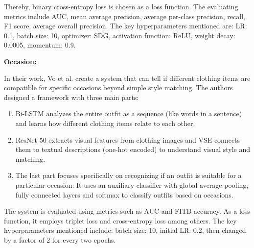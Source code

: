 Thereby, binary cross-entropy loss is chosen as a loss function. The evaluating metrics include \acs{AUC}, mean average precision, average per-class precision, recall, F1 score, average overall precision. The key hyperparameters mentioned are: \acs{LR}: 0.1, batch size: 10, optimizer: SDG, activation function: \acs{ReLU}, weight decay: 0.0005, momentum: 0.9. \cite[cf.]{pang_learning_2024}

\vspace{0.5cm}

\textbf{Occasion:}

\vspace{0.5cm}

In their work, Vo et al. create a system that can tell if different clothing items are compatible for specific occasions beyond simple style matching. The authors designed a framework with three main parts: \cite[cf.]{vo_efficient_2023}

\begin{enumerate}
  \item \acs{Bi-LSTM} analyzes the entire outfit as a sequence (like words in a sentence) and learns how different clothing items relate to each other.
  \item \acs{ResNet} 50 extracts visual features from clothing images and \acs{VSE} connects them to textual descriptions (one-hot encoded) to understand visual style and matching.
  \item The last part focuses specifically on recognizing if an outfit is suitable for a particular occasion. It uses an auxiliary classifier with global average pooling, fully connected layers and softmax to classify outfits based on occasions.
\end{enumerate}

The system is evaluated using metrics such as \acs{AUC} and \acs{FITB} accuracy. As a loss function, it employs triplet loss and cross-entropy loss among others. The key hyperparameters mentioned include: batch size: 10, initial \acs{LR}: 0.2, then changed by a factor of 2 for every two epochs. \cite[cf.]{vo_efficient_2023}
